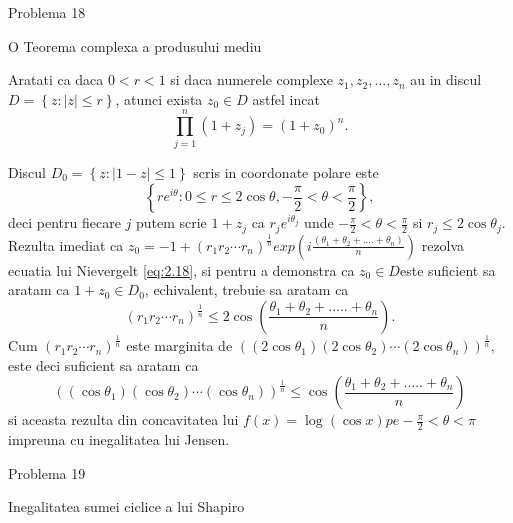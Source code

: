 \documentclass[a4paper,12pt,oneside]{report}
\begin{document}
Problema 18

O Teorema complexa a produsului mediu 

Aratati ca daca \(0 < r < 1\) si daca numerele complexe \(z_{1}, z_{2},...,z_{n}\) au in discul \(D = \left \{ z: \left | z \right | \leq r\right \}\), atunci exista \(z_{0} \in D\) astfel incat 
\begin{displaymath}
    \prod_{j = 1}^{n}\left ( 1 + z_{j} \right ) = \left ( 1 + z_{0} \right )^{n}.\label{eq:2.18} \tag{2.18}
\end{displaymath}

Discul \(D_{0} = \left \{ z : \left | 1 - z \right |\leq 1 \right \}\) scris in coordonate polare este 
\begin{displaymath}
    \left \{ re^{i\theta } : 0 \leq r\leq 2\cos\theta , -\frac{\pi }{2}< \theta  < \frac{\pi }{2} \right \},
\end{displaymath}
deci pentru fiecare \(j\) putem scrie \(1 + z_{j}\) ca \(r_{j}e^{i\theta _{j}}\) unde \(-\frac{\pi }{2}< \theta  < \frac{\pi }{2}\) si \( r_{j}\leq 2\cos\theta _{j}\). Rezulta imediat ca \(z_{0} = -1 + \left ( r_{1} r_{2}\cdots r_{n}\right )^{\frac{1}{n}}exp\left ( i\frac{\left ( \theta _{1} + \theta _{2} +....+ \theta _{n} \right )}{n} \right )\) rezolva ecuatia lui Nievergelt \ref{eq:2.18}, si pentru a demonstra ca \(z_{0}\in D \)este suficient sa aratam ca \(1 + z_{0}\in D_{0}\), echivalent, trebuie sa aratam ca 
\begin{displaymath}
    \left ( r_{1} r_{2} \cdots r_{n}\right )^{\frac{1}{n}}\leq 2\cos\left ( \frac{\theta _{1} + \theta _{2}+.....+\theta _{n}}{n} \right ) \label{eq:2.19} \tag{2.19}. 
\end{displaymath}
Cum \(\left ( r_{1} r_{2} \cdots r_{n}\right )^{\frac{1}{n}}\) este marginita de \(\left ( \left (2\cos\theta _{1}  \right )\left ( 2\cos\theta _{2} \right )\cdots \left (2\cos\theta _{n}  \right ) \right )^{\frac{1}{n}}\), este deci suficient sa aratam ca 
\begin{displaymath}
    \left ( \left (\cos\theta _{1}  \right )\left ( \cos\theta _{2} \right )\cdots \left (\cos\theta _{n}  \right ) \right )^{\frac{1}{n}}\leq \cos\left ( \frac{\theta _{1} + \theta _{2}+.....+\theta _{n}}{n} \right )
\end{displaymath}
si aceasta rezulta din concavitatea lui \(f\left ( x \right ) = \log \left ( \cos x \right ) pe -\frac{\pi }{2}< \theta < \pi\) impreuna cu inegalitatea lui Jensen. 


Problema 19 

Inegalitatea sumei ciclice a lui Shapiro
\end{document}
